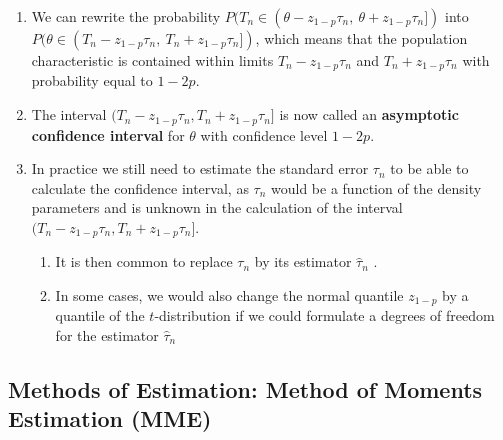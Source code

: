 \begin{enumerate}
    \item We can rewrite the probability $P(T_n \in  (\theta  - z_{1- p} \tau _n ,\ \theta  + z_{1- p} \tau_ n ])$ into $P(\theta  \in  (T_n - z_{1- p} \tau _n ,\ T_n + z_{1- p} \tau _n ])$, which means that the population characteristic is contained within limits $T_n - z_{1- p} \tau _n$ and $T_n + z_{1- p} \tau _n$ with probability equal to $1 - 2 p$.
    \hfill \cite{statistics/book/Statistics-for-Data-Scientists/Maurits-Kaptein}

    \item The interval $(T_n - z_{1- p} \tau_n , T_n + z_{1- p} \tau_n ]$ is now called an \textbf{asymptotic confidence interval} for $\theta$ with confidence level $1 - 2 p$.
    \hfill \cite{statistics/book/Statistics-for-Data-Scientists/Maurits-Kaptein}

    \item In practice we still need to estimate the standard error $\tau_n$ to be able to calculate the confidence interval, as $\tau_n$ would be a function of the density parameters and is unknown in the calculation of the interval $(T_n - z_{1- p} \tau_n , T_n + z_{1- p} \tau_n ]$.
    \hfill \cite{statistics/book/Statistics-for-Data-Scientists/Maurits-Kaptein}
    \begin{enumerate}
        \item It is then common to replace $\tau_n$ by its estimator $\hat{\tau}_n$ .
        \hfill \cite{statistics/book/Statistics-for-Data-Scientists/Maurits-Kaptein}

        \item In some cases, we would also change the normal quantile $z_{1- p}$ by a quantile of the $t$-distribution if we could formulate a degrees of freedom for the estimator $\hat{\tau}_n$
        \hfill \cite{statistics/book/Statistics-for-Data-Scientists/Maurits-Kaptein}
    \end{enumerate}
\end{enumerate}


\subsection{Methods of Estimation: Method of Moments Estimation (MME)}

